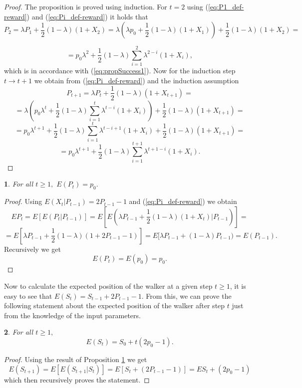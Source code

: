 \documentclass{amsart}
\theoremstyle{definition}
\theoremstyle{plain}
\newtheorem{prop}{\protect\propositionname}[section]
\theoremstyle{plain}
\numberwithin{equation}{section}
\providecommand{\propositionname}{Proposition}
\begin{document}
\begin{proof}
The proposition is proved using induction. For $t=2$ using (\ref{eq:P1_def-reward})
and (\ref{eq:Pi_def-reward}) it holds that
\[
P_{2}=\lambda P_{1}+\frac{1}{2}(1-\lambda)(1+X_{2})=\lambda(\lambda p_{0}+\frac{1}{2}(1-\lambda)(1+X_{1}))+\frac{1}{2}(1-\lambda)(1+X_{2})=
\]

\[
=p_{0}\lambda^{2}+\frac{1}{2}(1-\lambda)\sum_{i=1}^{2}\lambda^{2-i}(1+X_{i}),
\]
which is in accordance with (\ref{eq:propSuccess1}). Now for the
induction step $t\rightarrow t+1$ we obtain from (\ref{eq:Pi_def-reward})
and the induction assumption
\[
P_{t+1}=\lambda P_{t}+\frac{1}{2}(1-\lambda)(1+X_{t+1})=
\]
\[
=\lambda(p_{0}\lambda^{t}+\frac{1}{2}(1-\lambda)\sum_{i=1}^{t}\lambda^{t-i}(1+X_{i}))+\frac{1}{2}(1-\lambda)(1+X_{t+1})=
\]
\[
=p_{0}\lambda^{t+1}+\frac{1}{2}(1-\lambda)\sum_{i=1}^{t}\lambda^{t-i+1}(1+X_{i})+\frac{1}{2}(1-\lambda)(1+X_{t+1})=
\]
\[
=p_{0}\lambda^{t+1}+\frac{1}{2}(1-\lambda)\sum_{i=1}^{t+1}\lambda^{t+1-i}(1+X_{i}).
\]
\end{proof}

\begin{prop}
\label{PropReward2}For all $t\geq1,$ $E(P_{t})=p_{0}.$
\end{prop}
\begin{proof}
Using $E(X_{t}|P_{t-1})=2P_{t-1}-1$ and (\ref{eq:Pi_def-reward})
we obtain
\[
EP_{t}=E[E(P_{t}|P_{t-1})]=E[E(\lambda P_{t-1}+\frac{1}{2}(1-\lambda)(1+X_{t})|P_{t-1})]=
\]
\[
=E[\lambda P_{t-1}+\frac{1}{2}(1-\lambda)(1+2P_{t-1}-1)]=E[\lambda P_{t-1}+(1-\lambda)P_{t-1})=  E(P_{t-1}).
\]
Recursively we get 
\begin{equation}
E(P_{t})=E(p_{0})=p_{0}.\label{eq:EPt-reward-formula}
\end{equation}
\end{proof}
Now to calculate the expected position of the walker at a given step
$t\geq1$, it is easy to see that $E(S_{t})=S_{t-1}+2P_{t-1}-1$.
From this, we can prove the following statement about the expected
position of the walker after step $t$ just from the knowledge of
the input parameters.

\begin{prop}
For all $t\geq1,$ 
\[
E(S_{t})=S_{0}+t(2p_{0}-1).
\]
\end{prop}
\begin{proof}
Using the result of Proposition \ref{PropReward2} we get 
\[
E(S_{t+1})=E[E(S_{t+1}|S_{t})]=E[S_{t}+(2P_{t-1}-1)]=
ES_{t}+(2p_{0}-1)
\]
which then recursively proves the statement.
\end{proof}
\end{document}
